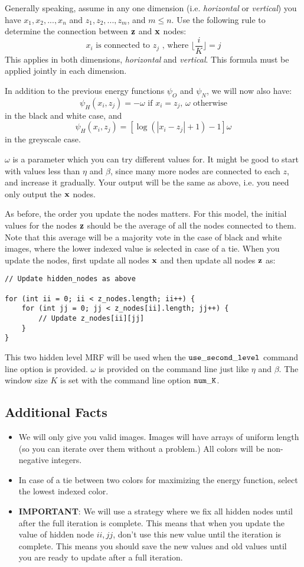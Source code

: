 \documentclass[11pt]{article}
\newcommand{\vx}{{\bf x}}
\newcommand{\vz}{{\bf z}}
\newcommand{\code}[1]{{\footnotesize \tt #1}}
\begin{document}
Generally speaking, assume in any one dimension (i.e. \emph{horizontal} or \emph{vertical}) you have $x_1, x_2, ..., x_n$ and $z_1, z_2, ..., z_m$, and $m \leq n$. Use the following rule to determine the connection between $\vz$ and $\vx$ nodes:
\[
x_i \textrm{ is connected to } z_j \textrm{ , where } \lfloor \frac{i}{K} \rfloor = j
\]
This applies in both dimensions, \emph{horizontal} and \emph{vertical}. This formula must be applied jointly in each dimension. 

In addition to the previous energy functions $\psi_O$ and $\psi_N$, we will now also have:
\[
	\psi_H(x_i, z_j) = - \omega \text{ if } x_i = z_j \text{, } \omega \text{ otherwise}
\]
in the black and white case, and
\[
	\psi_H(x_i, z_j) = [\log (|x_i - z_j| +1) -1] \omega
\]
in the greyscale case.

$\omega$ is a parameter which you can try different values for. It might be good to start with values less than $\eta$ and $\beta$, since many more nodes are connected to each $z$, and increase it gradually. Your output will be the same as above, i.e. you need only output the $\vx$ nodes.

As before, the order you update the nodes matters. For this model, the initial values for the nodes $\vz$ should be the average of all the nodes connected to them. Note that this average will be a majority vote in the case of black and white images, where the lower indexed value is selected in case of a tie. When you update the nodes, first update all nodes $\vx$ and then update all nodes $\vz$ as:


\begin{verbatim}
// Update hidden_nodes as above

for (int ii = 0; ii < z_nodes.length; ii++) {
    for (int jj = 0; jj < z_nodes[ii].length; jj++) {
        // Update z_nodes[ii][jj]
    }
}
\end{verbatim}

This two hidden level MRF will be used when the $\code{use\_second\_level}$ command line option is provided. $\omega$ is provided on the command line just like $\eta$ and $\beta$. The window size $K$ is set with the command line option $\code{num\_K}$.

\subsection{Additional Facts}
\begin{itemize}
\item We will only give you valid images. Images will have arrays of uniform length (so you can iterate over them without a problem.) All colors will be non-negative integers.
\item In case of a tie between two colors for maximizing the energy function, select the lowest indexed color.
\item {\bf IMPORTANT}: We will use a strategy where we fix all hidden nodes until after the full iteration is complete. This means that when you update the value of hidden node $ii,jj$, don't use this new value until the iteration is complete. This means you should save the new values and old values until you are ready to update after a full iteration.
\end{itemize}
\end{document}
